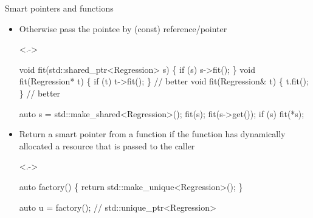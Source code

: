 \begin{frame}[fragile]{Smart pointers and functions \insertcontinuationtext}
  \begin{itemize}[<+->]
  \item Otherwise pass the pointee by (const) reference/pointer
    \begin{codeblock}<.->{
void fit(std::shared_ptr<Regression> s) \{ if (s) s->fit(); \}
void fit(Regression* t)                 \{ if (t) t->fit(); \} // better
void fit(Regression& t)                 \{ t.fit(); \}         // better

auto s = std::make_shared<Regression>();
fit(s);
fit(s->get());
if (s) fit(*s);}\end{codeblock}

  \item Return a smart pointer from a function if the function
    has dynamically allocated a resource that is passed to the caller

    \begin{codeblock}<.->{
auto factory() \{ return std::make_unique<Regression>(); \}

auto u = factory();     // std::unique_ptr<Regression>

}\end{codeblock}

  \end{itemize}

\end{frame}


